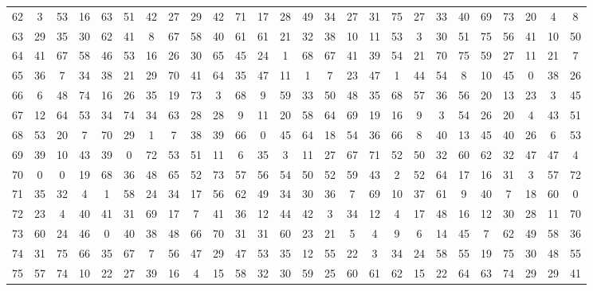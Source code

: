 \begin{table}
\begin{tabular}{c c c c c c c c c c c c c c c c c c c c c c c c c c }
62 & 3 & 53 & 16 & 63 & 51 & 42 & 27 & 29 & 42 & 71 & 17 & 28 & 49 & 34 & 27 & 31 & 75 & 27 & 33 & 40 & 69 & 73 & 20 & 4 & 8 \\
63 & 29 & 35 & 30 & 62 & 41 & 8 & 67 & 58 & 40 & 61 & 61 & 21 & 32 & 38 & 10 & 11 & 53 & 3 & 30 & 51 & 75 & 56 & 41 & 10 & 50 \\
64 & 41 & 67 & 58 & 46 & 53 & 16 & 26 & 30 & 65 & 45 & 24 & 1 & 68 & 67 & 41 & 39 & 54 & 21 & 70 & 75 & 59 & 27 & 11 & 21 & 7 \\
65 & 36 & 7 & 34 & 38 & 21 & 29 & 70 & 41 & 64 & 35 & 47 & 11 & 1 & 7 & 23 & 47 & 1 & 44 & 54 & 8 & 10 & 45 & 0 & 38 & 26 \\
66 & 6 & 48 & 74 & 16 & 26 & 35 & 19 & 73 & 3 & 68 & 9 & 59 & 33 & 50 & 48 & 35 & 68 & 57 & 36 & 56 & 20 & 13 & 23 & 3 & 45 \\
67 & 12 & 64 & 53 & 34 & 74 & 34 & 63 & 28 & 28 & 9 & 11 & 20 & 58 & 64 & 69 & 19 & 16 & 9 & 3 & 54 & 26 & 20 & 4 & 43 & 51 \\
68 & 53 & 20 & 7 & 70 & 29 & 1 & 7 & 38 & 39 & 66 & 0 & 45 & 64 & 18 & 54 & 36 & 66 & 8 & 40 & 13 & 45 & 40 & 26 & 6 & 53 \\
69 & 39 & 10 & 43 & 39 & 0 & 72 & 53 & 51 & 11 & 6 & 35 & 3 & 11 & 27 & 67 & 71 & 52 & 50 & 32 & 60 & 62 & 32 & 47 & 47 & 4 \\
70 & 0 & 0 & 19 & 68 & 36 & 48 & 65 & 52 & 73 & 57 & 56 & 54 & 50 & 52 & 59 & 43 & 2 & 52 & 64 & 17 & 16 & 31 & 3 & 57 & 72 \\
71 & 35 & 32 & 4 & 1 & 58 & 24 & 34 & 17 & 56 & 62 & 49 & 34 & 30 & 36 & 7 & 69 & 10 & 37 & 61 & 9 & 40 & 7 & 18 & 60 & 0 \\
72 & 23 & 4 & 40 & 41 & 31 & 69 & 17 & 7 & 41 & 36 & 12 & 44 & 42 & 3 & 34 & 12 & 4 & 17 & 48 & 16 & 12 & 30 & 28 & 11 & 70 \\
73 & 60 & 24 & 46 & 0 & 40 & 38 & 48 & 66 & 70 & 31 & 31 & 60 & 23 & 21 & 5 & 4 & 9 & 6 & 14 & 45 & 7 & 62 & 49 & 58 & 36 \\
74 & 31 & 75 & 66 & 35 & 67 & 7 & 56 & 47 & 29 & 47 & 53 & 35 & 12 & 55 & 22 & 3 & 34 & 24 & 58 & 55 & 19 & 75 & 30 & 48 & 55 \\
75 & 57 & 74 & 10 & 22 & 27 & 39 & 16 & 4 & 15 & 58 & 32 & 30 & 59 & 25 & 60 & 61 & 62 & 15 & 22 & 64 & 63 & 74 & 29 & 29 & 41 \\
\hline
\end{tabular}
\end{table}